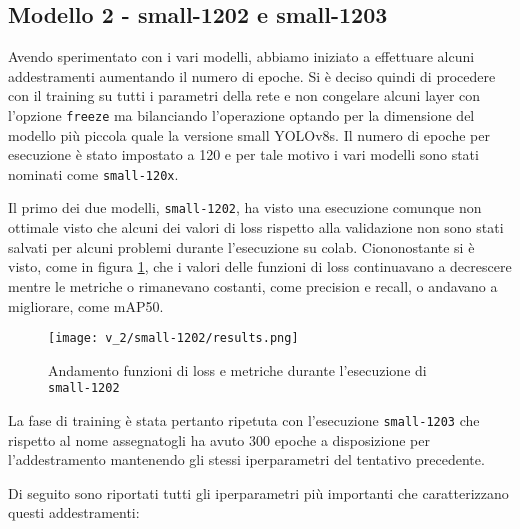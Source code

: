 \subsection*{Modello 2 - small-1202 e small-1203}

Avendo sperimentato con i vari modelli, abbiamo iniziato a effettuare alcuni addestramenti aumentando il
numero di epoche. Si è deciso quindi di procedere con il training su tutti i parametri della rete e non
congelare alcuni layer con l'opzione \verb|freeze| ma bilanciando l'operazione optando per la dimensione
del modello più piccola quale la versione small YOLOv8s. Il numero di epoche per esecuzione è stato impostato a 120 e per tale motivo i vari modelli sono stati
nominati come \verb|small-120x|. 

Il primo dei due modelli, \verb|small-1202|, ha visto una esecuzione 
comunque non ottimale visto che alcuni dei valori di loss rispetto alla validazione non sono stati 
salvati per alcuni problemi durante l'esecuzione su colab. Ciononostante si è visto, come in figura
\ref{fig:v2-1}, che i valori delle funzioni di loss continuavano a decrescere mentre le metriche
o rimanevano costanti, come precision e recall, o andavano a migliorare, come mAP50.

\begin{figure}[h]
    \centering
    \texttt{[image: v\_2/small-1202/results.png]}
    \caption{Andamento funzioni di loss e metriche durante l'esecuzione di \texttt{small-1202}}
    \label{fig:v2-1}
\end{figure}

La fase di training è stata pertanto ripetuta con l'esecuzione \verb|small-1203| che rispetto al nome assegnatogli
ha avuto 300 epoche a disposizione per l'addestramento mantenendo gli stessi iperparametri del tentativo precedente.

Di seguito sono riportati tutti gli iperparametri più importanti che caratterizzano questi addestramenti:

